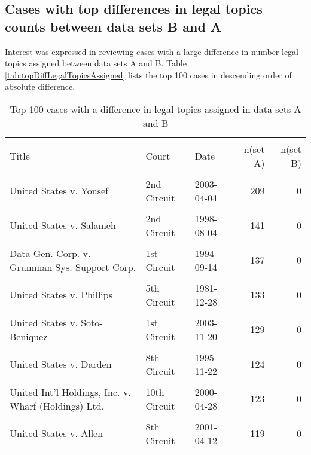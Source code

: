 \documentclass[10pt, letterpaper]{article}
\begin{document}
\begin{spacing}{1.0}

\clearpage

\section{Cases with top differences in legal topics counts between data sets B and A}

Interest was expressed in reviewing cases with a large difference in number legal topics assigned between data sets A and B.  Table \ref{tab:topDiffLegalTopicsAssigned} lists the top 100 cases in descending order of absolute difference.

\vspace{0.25in}

\begin{footnotesize}
\begin{longtable}[H]{p{3.5in}llrr}
    \caption{Top 100 cases with a difference in legal topics assigned in data sets A and B}\\[-4pt]
    \hline\\[-6pt]
    Title & Court & Date & n(set A) & n(set B) \\[2pt]
    \hline\\[-6pt]
    \endhead
United States v. Yousef & 2nd Circuit & 2003-04-04 & 209 & 0\\
& & & &\\[-6pt]
United States v. Salameh & 2nd Circuit & 1998-08-04 & 141 & 0\\
& & & &\\[-6pt]
Data Gen. Corp. v. Grumman Sys. Support Corp. & 1st Circuit & 1994-09-14 & 137 & 0\\
& & & &\\[-6pt]
United States v. Phillips & 5th Circuit & 1981-12-28 & 133 & 0\\
& & & &\\[-6pt]
United States v. Soto-Beniquez & 1st Circuit & 2003-11-20 & 129 & 0\\
& & & &\\[-6pt]
United States v. Darden & 8th Circuit & 1995-11-22 & 124 & 0\\
& & & &\\[-6pt]
United Int'l Holdings, Inc. v. Wharf (Holdings) Ltd. & 10th Circuit & 2000-04-28 & 123 & 0\\
& & & &\\[-6pt]
United States v. Allen & 8th Circuit & 2001-04-12 & 119 & 0\\

\end{longtable}
\end{footnotesize}
\end{spacing}
\end{document}

